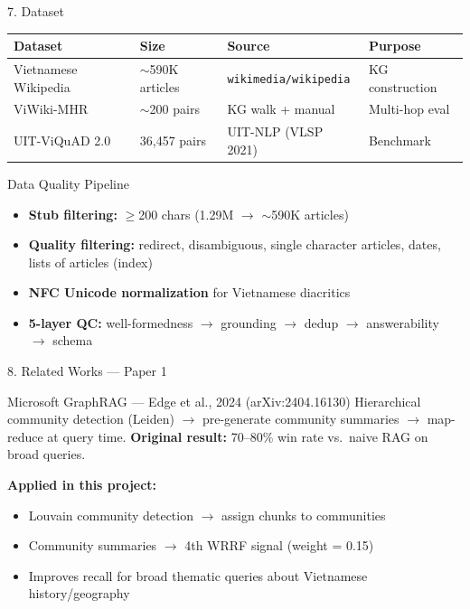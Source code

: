 \documentclass[aspectratio=169]{beamer}
\begin{document}
\begin{frame}[shrink=5]{7. Dataset}
\begin{center}
\begin{tabular}{llll}
\toprule
\textbf{Dataset} & \textbf{Size} & \textbf{Source} & \textbf{Purpose} \\
\midrule
Vietnamese Wikipedia & $\sim$590K articles & \texttt{wikimedia/wikipedia} & KG construction \\
ViWiki-MHR & $\sim$200 pairs & KG walk + manual & Multi-hop eval \\
UIT-ViQuAD 2.0 & 36,457 pairs & UIT-NLP (VLSP 2021) & Benchmark \\
\bottomrule
\end{tabular}
\end{center}
\vspace{0.4em}
\begin{exampleblock}{Data Quality Pipeline}
\begin{itemize}
  \item \textbf{Stub filtering:} $\geq$200 chars (1.29M $\rightarrow$ $\sim$590K articles)
  \item \textbf{Quality filtering:} redirect, disambiguous, single character articles, dates, lists of articles (index)
  \item \textbf{NFC Unicode normalization} for Vietnamese diacritics
  \item \textbf{5-layer QC:} well-formedness $\rightarrow$ grounding $\rightarrow$ dedup $\rightarrow$ answerability $\rightarrow$ schema
\end{itemize}
\end{exampleblock}
\end{frame}

\begin{frame}{8. Related Works --- Paper 1}
\begin{block}{Microsoft GraphRAG --- Edge et al., 2024 (arXiv:2404.16130)}
Hierarchical community detection (Leiden) $\rightarrow$ pre-generate community summaries $\rightarrow$ map-reduce at query time. \textbf{Original result:} 70--80\% win rate vs.\ naive RAG on broad queries.
\end{block}
\vspace{0.6em}
\textbf{Applied in this project:}
\begin{itemize}
  \item Louvain community detection $\rightarrow$ assign chunks to communities
  \item Community summaries $\rightarrow$ 4th WRRF signal (weight = 0.15)
  \item Improves recall for broad thematic queries about Vietnamese history/geography
\end{itemize}
\end{frame}
\end{document}

